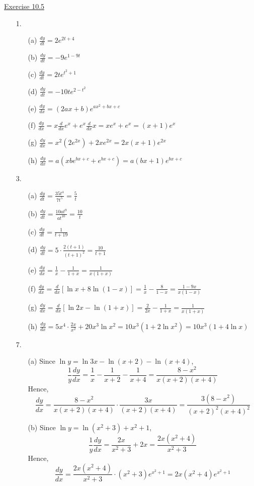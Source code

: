 \underline{Exercise 10.5}
\begin{enumerate}
\item[1.]
\begin{enumerate}
\item[(a)] $\displaystyle \frac{dy}{dt}=2e^{2t+4}$
\item[(b)] $\displaystyle \frac{dy}{dt}=-9e^{1-9t}$
\item[(c)] $\displaystyle \frac{dy}{dt}=2te^{t^{2}+1}$
\item[(d)] $\displaystyle \frac{dy}{dt}=-10te^{2-t^{2}}$
\item[(e)] $\displaystyle \frac{dy}{dx}=(2ax+b)e^{ax^{2}+bx+c}$
\item[(f)] $\displaystyle \frac{dy}{dx}=x\frac{d}{dx}e^{x}+e^{x}\frac{d}{dx}x=xe^{x}+e^{x}=(x+1)e^{x}$
\item[(g)] $\displaystyle \frac{dy}{dx}=x^{2}\left(2e^{2x}\right)+2xe^{2x}=2x(x+1)e^{2x}$
\item[(h)] $\displaystyle \frac{dy}{dx}=a\left(xbe^{bx+c}+e^{bx+c}\right)=a(bx+1)e^{bx+c}$
\end{enumerate}

\item[3.]
\begin{enumerate}
\item[(a)] $\displaystyle \frac{dy}{dt}=\frac{35t^{4}}{7t^{5}}=\frac{5}{t}$
\item[(b)] $\displaystyle \frac{dy}{dt}=\frac{10at^{9}}{at^{10}}=\frac{10}{t}$
\item[(c)] $\displaystyle \frac{dy}{dt}=\frac{1}{t+19}$
\item[(d)] $\displaystyle \frac{dy}{dt}=5\cdot\frac{2(t+1)}{(t+1)^{2}}=\frac{10}{t+1}$
\item[(e)] $\displaystyle \frac{dy}{dx}=\frac{1}{x}-\frac{1}{1+x}=\frac{1}{x(1+x)}$
\item[(f)] $\displaystyle \frac{dy}{dx}=\frac{d}{dx}\left[\ln x+8\ln(1-x)\right]=\frac{1}{x}-\frac{8}{1-x}=\frac{1-9x}{x(1-x)}$
\item[(g)] $\displaystyle \frac{dy}{dx}=\frac{d}{dx}\left[\ln 2x-\ln(1+x)\right]=\frac{2}{2x}-\frac{1}{1+x}=\frac{1}{x(1+x)}$
\item[(h)] $\displaystyle \frac{dy}{dx}=5x^{4}\cdot\frac{2x}{x^{2}}+20x^{3}\ln x^{2}=10x^{3}\left(1+2\ln x^{2}\right)=10x^{3}(1+4\ln x)$
\end{enumerate}

\item[7.]
\begin{enumerate}
\item[(a)] Since $\ln y=\ln 3x-\ln(x+2)-\ln(x+4)$,
\[ \frac{1}{y}\frac{dy}{dx}=\frac{1}{x}-\frac{1}{x+2}-\frac{1}{x+4}=\frac{8-x^{2}}{x(x+2)(x+4)} \]
Hence,
\[ \frac{dy}{dx}=\frac{8-x^{2}}{x(x+2)(x+4)}\cdot\frac{3x}{(x+2)(x+4)}=\frac{3\left(8-x^{2}\right)}{(x+2)^{2}(x+4)^{2}} \]
\item[(b)] Since $\ln y=\ln\left(x^{2}+3\right)+x^{2}+1$,
\[ \frac{1}{y}\frac{dy}{dx}=\frac{2x}{x^{2}+3}+2x=\frac{2x\left(x^{2}+4\right)}{x^{2}+3} \]
Hence,
\[ \frac{dy}{dx}=\frac{2x\left(x^{2}+4\right)}{x^{2}+3}\cdot\left(x^{2}+3\right)e^{x^{2}+1}=2x\left(x^{2}+4\right)e^{x^{2}+1} \]
\end{enumerate}
\end{enumerate}
